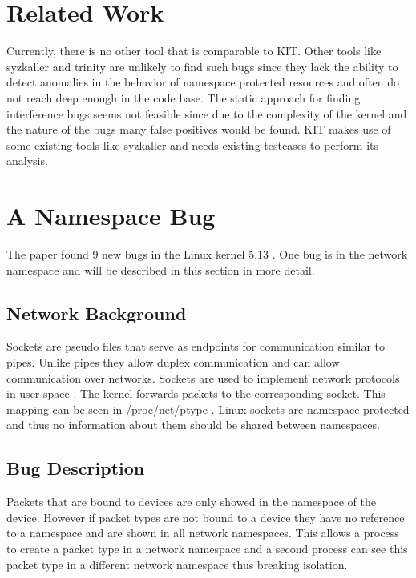 \documentclass[10pt,twocolumn,a4paper]{article}
\begin{document}
\section{Related Work}
Currently, there is no other tool that is comparable to  KIT. Other tools like syzkaller\cite{4} and trinity\cite{5} are
unlikely to find such bugs since they lack the ability to detect anomalies in the behavior of
namespace protected resources and often do not reach deep enough in the code base.
The static approach for finding interference bugs seems not feasible
since due to the complexity of the kernel and the nature of the bugs many false positives would
be found. KIT makes use of some existing tools like syzkaller and needs existing testcases to
perform its analysis\cite{0}\cite{2}.
\section{A Namespace Bug}\label{sec:bug}
The paper found 9 new bugs in the Linux kernel 5.13 \cite{0}. One bug is in the network namespace
and will be described in this section in more detail. 
\subsection{Network Background}
Sockets are pseudo files that serve as endpoints for communication similar to pipes. Unlike pipes
they allow duplex communication and can allow communication over networks\cite{5}. Sockets are
used to implement network protocols in user space \cite{5}. The kernel forwards packets to the
corresponding socket. This mapping can be seen in /proc/net/ptype \cite{6}. Linux sockets are
namespace protected and thus no information about them should be shared between namespaces.

\subsection{Bug Description}
Packets that are bound to devices are only showed in the namespace of the device. However if packet
types are not bound to a device they have no reference to a namespace and are shown in all network
namespaces. This allows a process to create a packet type in a network namespace and a second
process can see this packet type in a different network namespace thus breaking isolation.
\end{document}
